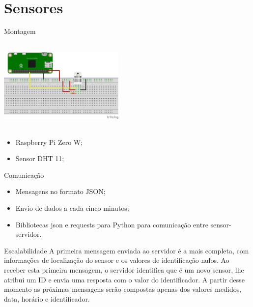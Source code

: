 \documentclass{beamer}
\begin{document}
  \section{Sensores}
  \begin{frame}{Montagem}
    \begin{center}
    \includegraphics[height=130pt, width=175pt]{sensor}
  \end{center}
    \begin{itemize}
      \item Raspberry Pi Zero W;
      \item Sensor DHT 11;
    \end{itemize}
  \end{frame}
  \begin{frame}{Comunica\c{c}\~{a}o}
    \begin{itemize}
      \item Mensagens no formato JSON;
      \item Envio de dados a cada cinco minutos;
      \item Bibliotecas json e requests para Python para comunica\c{c}\~{a}o entre sensor-servidor.
    \end{itemize}
  \end{frame}
  \begin{frame}{Escalabilidade}
    A primeira mensagem enviada ao servidor \'{e} a mais completa, com informa\c{c}\~{o}es de localiza\c{c}\~{a}o do sensor e os valores de identifica\c{c}\~{a}o nulos. Ao receber esta primeira mensagem, o servidor identifica que \'{e} um novo sensor, lhe atribui um ID e envia uma resposta com o valor do identificador. A partir desse momento as pr\'{o}ximas mensagens ser\~{a}o compostas apenas dos valores medidos, data, hor\'{a}rio e identificador.
  \end{frame}
\end{document}
